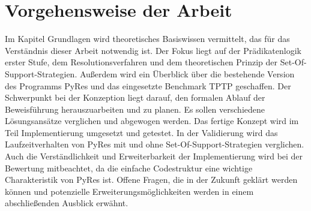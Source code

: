 \section{Vorgehensweise der Arbeit}

Im Kapitel Grundlagen wird theoretisches Basiswissen vermittelt, das für das Verständnis dieser Arbeit notwendig ist. Der Fokus liegt auf der Prädikatenlogik erster Stufe, dem Resolutionsverfahren und dem theoretischen Prinzip der Set-Of-Support-Strategien. Außerdem wird ein Überblick über die bestehende Version des Programms PyRes und das eingesetzte Benchmark TPTP geschaffen.
Der Schwerpunkt bei der Konzeption liegt darauf, den formalen Ablauf der Beweisführung herauszuarbeiten und zu planen. Es sollen verschiedene Lösungsansätze verglichen und abgewogen werden. Das fertige Konzept wird im Teil Implementierung umgesetzt und getestet.
In der Validierung wird das Laufzeitverhalten von PyRes mit und ohne Set-Of-Support-Strategien verglichen. Auch die Verständlichkeit und Erweiterbarkeit der Implementierung wird bei der Bewertung mitbeachtet, da die einfache Codestruktur eine wichtige Charakteristik von PyRes ist. Offene Fragen, die in der Zukunft geklärt werden können und potenzielle Erweiterungsmöglichkeiten werden in einem abschließenden Ausblick erwähnt.